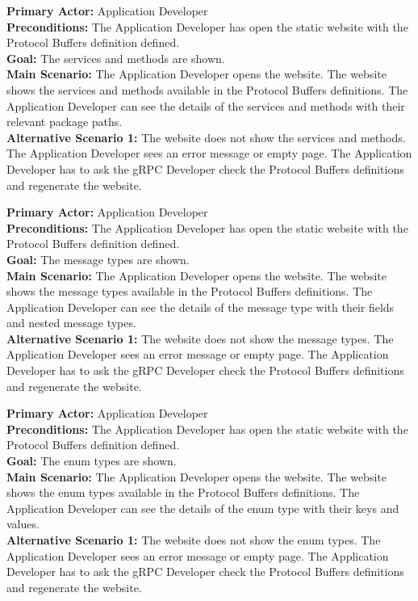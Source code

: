 
\textbf{Primary Actor:} Application Developer\\
\textbf{Preconditions:} The Application Developer has open the static website with the Protocol Buffers definition defined.\\
\textbf{Goal:} The services and methods are shown.\\
\textbf{Main Scenario:}
The Application Developer opens the website.
The website shows the services and methods available in the Protocol Buffers definitions.
The Application Developer can see the details of the services and methods with their relevant package paths.\\
\textbf{Alternative Scenario 1:}
The website does not show the services and methods.
The Application Developer sees an error message or empty page.
The Application Developer has to ask the gRPC Developer check the Protocol Buffers definitions and regenerate the website.


\textbf{Primary Actor:} Application Developer\\
\textbf{Preconditions:} The Application Developer has open the static website with the Protocol Buffers definition defined.\\
\textbf{Goal:} The message types are shown.\\
\textbf{Main Scenario:}
The Application Developer opens the website.
The website shows the message types available in the Protocol Buffers definitions.
The Application Developer can see the details of the message type with their fields and nested message types.\\
\textbf{Alternative Scenario 1:}
The website does not show the message types.
The Application Developer sees an error message or empty page.
The Application Developer has to ask the gRPC Developer check the Protocol Buffers definitions and regenerate the website.


\textbf{Primary Actor:} Application Developer\\
\textbf{Preconditions:} The Application Developer has open the static website with the Protocol Buffers definition defined.\\
\textbf{Goal:} The enum types are shown.\\
\textbf{Main Scenario:}
The Application Developer opens the website.
The website shows the enum types available in the Protocol Buffers definitions.
The Application Developer can see the details of the enum type with their keys and values.\\
\textbf{Alternative Scenario 1:}
The website does not show the enum types.
The Application Developer sees an error message or empty page.
The Application Developer has to ask the gRPC Developer check the Protocol Buffers definitions and regenerate the website.

